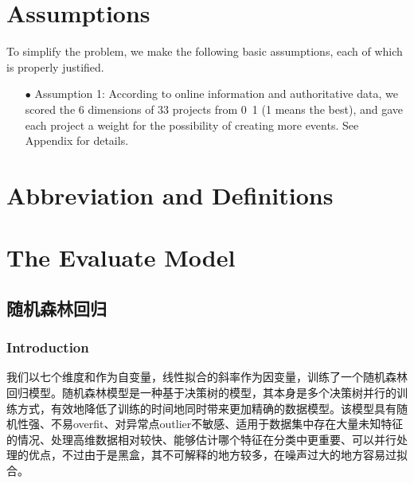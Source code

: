 \documentclass[a4paper]{article}
\begin{document}
\section{Assumptions}
To simplify the problem, we make the following basic assumptions, each of which is
properly justified.
\begin{itemize}
\item[$\bullet$]Assumption 1: According to online information and authoritative data, 
we scored the 6 dimensions of 33 projects from 0~1 (1 means the best), and gave each project a weight for the possibility of creating more events. See Appendix for details.
\end{itemize}
\section{Abbreviation and Definitions}
\section{The Evaluate Model}

\subsection{随机森林回归}
\subsubsection{Introduction}

我们以七个维度和作为自变量，线性拟合的斜率作为因变量，训练了一个随机森林回归模型。随机森林模型是一种基于决策树的模型，其本身是多个决策树并行的训练方式，有效地降低了训练的时间地同时带来更加精确的数据模型。该模型具有随机性强、不易overfit、对异常点outlier不敏感、适用于数据集中存在大量未知特征的情况、处理高维数据相对较快、能够估计哪个特征在分类中更重要、可以并行处理的优点，不过由于是黑盒，其不可解释的地方较多，在噪声过大的地方容易过拟合。
\end{document}
